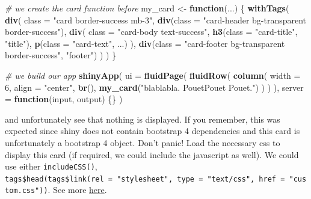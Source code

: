 \documentclass[
]{book}
\newenvironment{Shaded}{\begin{snugshade}}{\end{snugshade}}
\newcommand{\CommentTok}[1]{\textcolor[rgb]{0.56,0.35,0.01}{\textit{#1}}}
\newcommand{\ControlFlowTok}[1]{\textcolor[rgb]{0.13,0.29,0.53}{\textbf{#1}}}
\newcommand{\DataTypeTok}[1]{\textcolor[rgb]{0.13,0.29,0.53}{#1}}
\newcommand{\DecValTok}[1]{\textcolor[rgb]{0.00,0.00,0.81}{#1}}
\newcommand{\KeywordTok}[1]{\textcolor[rgb]{0.13,0.29,0.53}{\textbf{#1}}}
\newcommand{\NormalTok}[1]{#1}
\newcommand{\StringTok}[1]{\textcolor[rgb]{0.31,0.60,0.02}{#1}}
\begin{document}
\begin{Shaded}
\begin{Highlighting}[]
\CommentTok{# we create the card function before}
\NormalTok{my_card <-}\StringTok{ }\ControlFlowTok{function}\NormalTok{(...) \{}
  \KeywordTok{withTags}\NormalTok{(}
    \KeywordTok{div}\NormalTok{(}
      \DataTypeTok{class =} \StringTok{"card border-success mb-3"}\NormalTok{,}
      \KeywordTok{div}\NormalTok{(}\DataTypeTok{class =} \StringTok{"card-header bg-transparent border-success"}\NormalTok{),}
      \KeywordTok{div}\NormalTok{(}
        \DataTypeTok{class =} \StringTok{"card-body text-success"}\NormalTok{,}
        \KeywordTok{h3}\NormalTok{(}\DataTypeTok{class =} \StringTok{"card-title"}\NormalTok{, }\StringTok{"title"}\NormalTok{),}
        \KeywordTok{p}\NormalTok{(}\DataTypeTok{class =} \StringTok{"card-text"}\NormalTok{, ...)}
\NormalTok{      ),}
      \KeywordTok{div}\NormalTok{(}\DataTypeTok{class =} \StringTok{"card-footer bg-transparent border-success"}\NormalTok{, }\StringTok{"footer"}\NormalTok{)}
\NormalTok{    )}
\NormalTok{  )}
\NormalTok{\}}

\CommentTok{# we build our app}
\KeywordTok{shinyApp}\NormalTok{(}
  \DataTypeTok{ui =} \KeywordTok{fluidPage}\NormalTok{(}
    \KeywordTok{fluidRow}\NormalTok{(}
      \KeywordTok{column}\NormalTok{(}
        \DataTypeTok{width =} \DecValTok{6}\NormalTok{,}
        \DataTypeTok{align =} \StringTok{"center"}\NormalTok{,}
        \KeywordTok{br}\NormalTok{(),}
        \KeywordTok{my_card}\NormalTok{(}\StringTok{"blablabla. PouetPouet Pouet."}\NormalTok{)}
\NormalTok{      )}
\NormalTok{    )}
\NormalTok{  ),}
  \DataTypeTok{server =} \ControlFlowTok{function}\NormalTok{(input, output) \{\}}
\NormalTok{)}
\end{Highlighting}
\end{Shaded}

and unfortunately see that nothing is displayed. If you remember, this was expected since
shiny does not contain bootstrap 4 dependencies and this card is unfortunately a
bootstrap 4 object. Don't panic! Load the necessary css to display
this card (if required, we could include the javascript as well). We could use either
\texttt{includeCSS()}, \texttt{tags\$head(tags\$link(rel\ =\ "stylesheet",\ type\ =\ "text/css",\ href\ =\ "custom.css"))}. See
more \href{https://shiny.rstudio.com/articles/css.html}{here}.
\end{document}
